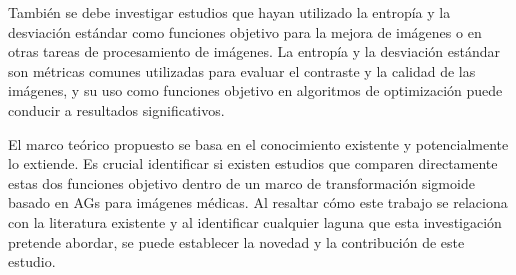 También se debe investigar estudios que hayan utilizado la entropía y la desviación estándar como funciones objetivo para la mejora de imágenes o en otras tareas de procesamiento de imágenes. La entropía y la desviación estándar son métricas comunes utilizadas para evaluar el contraste y la calidad de las imágenes, y su uso como funciones objetivo en algoritmos de optimización puede conducir a resultados significativos.

El marco teórico propuesto se basa en el conocimiento existente y potencialmente lo extiende. Es crucial identificar si existen estudios que comparen directamente estas dos funciones objetivo dentro de un marco de transformación sigmoide basado en AGs para imágenes médicas. Al resaltar cómo este trabajo se relaciona con la literatura existente y al identificar cualquier laguna que esta investigación pretende abordar, se puede establecer la novedad y la contribución de este estudio.